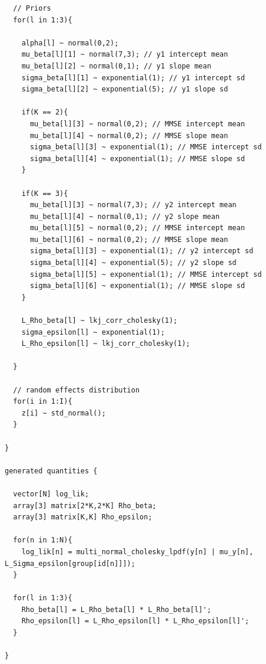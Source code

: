 \documentclass[12pt]{article}
\begin{document}
\begin{verbatim}
  // Priors
  for(l in 1:3){
    
    alpha[l] ~ normal(0,2); 
    mu_beta[l][1] ~ normal(7,3); // y1 intercept mean
    mu_beta[l][2] ~ normal(0,1); // y1 slope mean
    sigma_beta[l][1] ~ exponential(1); // y1 intercept sd
    sigma_beta[l][2] ~ exponential(5); // y1 slope sd
    
    if(K == 2){
      mu_beta[l][3] ~ normal(0,2); // MMSE intercept mean
      mu_beta[l][4] ~ normal(0,2); // MMSE slope mean
      sigma_beta[l][3] ~ exponential(1); // MMSE intercept sd
      sigma_beta[l][4] ~ exponential(1); // MMSE slope sd
    }
    
    if(K == 3){
      mu_beta[l][3] ~ normal(7,3); // y2 intercept mean
      mu_beta[l][4] ~ normal(0,1); // y2 slope mean
      mu_beta[l][5] ~ normal(0,2); // MMSE intercept mean
      mu_beta[l][6] ~ normal(0,2); // MMSE slope mean
      sigma_beta[l][3] ~ exponential(1); // y2 intercept sd
      sigma_beta[l][4] ~ exponential(5); // y2 slope sd  
      sigma_beta[l][5] ~ exponential(1); // MMSE intercept sd
      sigma_beta[l][6] ~ exponential(1); // MMSE slope sd
    }
    
    L_Rho_beta[l] ~ lkj_corr_cholesky(1);
    sigma_epsilon[l] ~ exponential(1);
    L_Rho_epsilon[l] ~ lkj_corr_cholesky(1);
    
  }
  
  // random effects distribution
  for(i in 1:I){
    z[i] ~ std_normal();
  }
  
}

generated quantities {

  vector[N] log_lik;
  array[3] matrix[2*K,2*K] Rho_beta;
  array[3] matrix[K,K] Rho_epsilon;

  for(n in 1:N){
    log_lik[n] = multi_normal_cholesky_lpdf(y[n] | mu_y[n], L_Sigma_epsilon[group[id[n]]]);
  }

  for(l in 1:3){
    Rho_beta[l] = L_Rho_beta[l] * L_Rho_beta[l]';
    Rho_epsilon[l] = L_Rho_epsilon[l] * L_Rho_epsilon[l]';  
  }

}
\end{verbatim}
\end{document}
